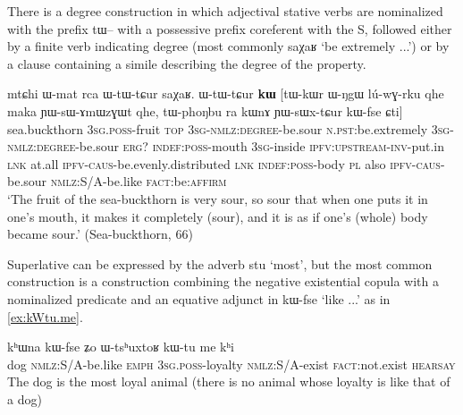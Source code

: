 \documentclass[oldfontcommands,oneside,a4paper,11pt]{article}
\newcommand{\ipa}[1]{{\phon #1}} %
\begin{document}
There is a degree construction in which adjectival stative verbs are nominalized with the prefix \ipa{tɯ--} with a possessive prefix coreferent with the S, followed either by a finite verb indicating degree (most commonly \ipa{saχaʁ} `be extremely ...') or by a clause containing a simile describing the degree of the property.


\begin{exe}
\ex \label{ex:YWsWxtCur}
\gll 
\ipa{mtɕhi}  	\ipa{ɯ-mat}  	\ipa{rca}  	\ipa{ɯ-tɯ-tɕur}  	\ipa{saχaʁ.}  	\ipa{ɯ-tɯ-tɕur}  	\ipa{\textbf{kɯ}}  	[\ipa{tɯ-kɯr}  	\ipa{ɯ-ŋgɯ}  	\ipa{lú-wɣ-rku}  	\ipa{qhe}  	\ipa{maka}  	\ipa{ɲɯ-sɯ-ɤmɯzɣɯt}  	\ipa{qhe,}  	\ipa{tɯ-phoŋbu}  	\ipa{ra}  	\ipa{kɯnɤ}  	\ipa{ɲɯ-sɯx-tɕur}  	\ipa{kɯ-fse}  	\ipa{ɕti}]  \\
sea.buckthorn \textsc{3sg.poss}-fruit \textsc{top} \textsc{3sg-nmlz:degree}-be.sour \textsc{n.pst}:be.extremely \textsc{3sg-nmlz:degree}-be.sour \textsc{erg?} \textsc{indef:poss}-mouth \textsc{3sg}-inside \textsc{ipfv:upstream-inv}-put.in \textsc{lnk} at.all \textsc{ipfv-caus}-be.evenly.distributed \textsc{lnk} \textsc{indef:poss}-body \textsc{pl} also \textsc{ipfv-caus}-be.sour \textsc{nmlz:S/A}-be.like \textsc{fact}:be:\textsc{affirm} \\
\glt `The fruit of the sea-buckthorn is very sour, so sour that when one puts it in one's mouth, it makes it completely (sour), and it is as if one's (whole) body became sour.' (Sea-buckthorn, 66)
\end{exe}

Superlative can be expressed by the adverb \ipa{stu} `most', but the most common construction is a construction combining the negative existential copula with a nominalized predicate and an equative adjunct in \ipa{kɯ-fse} `like ...' as in \ref{ex:kWtu.me}.

\begin{exe}
\ex \label{ex:kWtu.me}
\gll 
\ipa{kʰɯna}  	\ipa{kɯ-fse}  	\ipa{ʑo} 	\ipa{ɯ-tsʰuxtoʁ}  	\ipa{kɯ-tu}  	\ipa{me}  	\ipa{kʰi} \\  
dog \textsc{nmlz}:S/A-be.like  \textsc{emph} \textsc{3sg.poss}-loyalty \textsc{nmlz}:S/A-exist \textsc{fact}:not.exist \textsc{hearsay} \\
\glt The dog is the most loyal animal (there is no animal whose loyalty is like that of a dog)
\end{exe}

%
\end{document}
